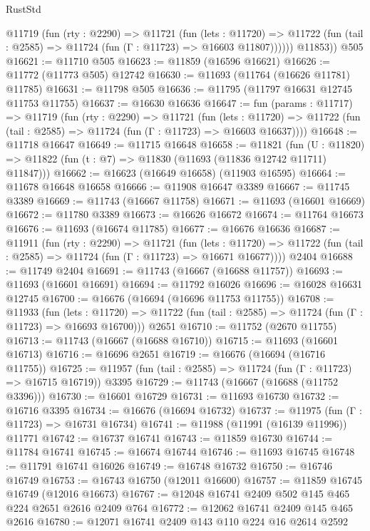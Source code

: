 \begin{lexlean}{RustStd}
\begin{coremodule}
          @11719
            (fun (rty : @2290) =>
            @11721
              (fun (lets : @11720) =>
              @11722 (fun (tail : @2585) => @11724 (fun (Γ : @11723) => @16603 @11807))))))
        @11853))
    @505
@16621 := @11710 @505
@16623 := @11859 (@16596 @16621)
@16626 := @11772 (@11773 @505) @12742
@16630 := @11693 (@11764 (@16626 @11781) @11785)
@16631 := @11798 @505
@16636 := @11795 (@11797 @16631 @12745 @11753 @11755)
@16637 := @16630 @16636
@16647 := fun (params : @11717) =>
  @11719
    (fun (rty : @2290) =>
    @11721
      (fun (lets : @11720) =>
      @11722 (fun (tail : @2585) => @11724 (fun (Γ : @11723) => @16603 @16637))))
@16648 := @11718 @16647
@16649 := @11715 @16648
@16658 := @11821
    (fun (U : @11820) => @11822 (fun (t : @7) => @11830 (@11693 (@11836 @12742 @11711) @11847)))
@16662 := @16623 (@16649 @16658) (@11903 @16595)
@16664 := @11678 @16648 @16658
@16666 := @11908 @16647 @3389
@16667 := @11745 @3389
@16669 := @11743 (@16667 @11758)
@16671 := @11693 (@16601 @16669)
@16672 := @11780 @3389
@16673 := @16626 @16672
@16674 := @11764 @16673
@16676 := @11693 (@16674 @11785)
@16677 := @16676 @16636
@16687 := @11911
    (fun (rty : @2290) =>
    @11721
      (fun (lets : @11720) =>
      @11722 (fun (tail : @2585) => @11724 (fun (Γ : @11723) => @16671 @16677))))
    @2404
@16688 := @11749 @2404
@16691 := @11743 (@16667 (@16688 @11757))
@16693 := @11693 (@16601 @16691)
@16694 := @11792 @16026
@16696 := @16028 @16631 @12745
@16700 := @16676 (@16694 (@16696 @11753 @11755))
@16708 := @11933
    (fun (lets : @11720) =>
    @11722 (fun (tail : @2585) => @11724 (fun (Γ : @11723) => @16693 @16700)))
    @2651
@16710 := @11752 (@2670 @11755)
@16713 := @11743 (@16667 (@16688 @16710))
@16715 := @11693 (@16601 @16713)
@16716 := @16696 @2651
@16719 := @16676 (@16694 (@16716 @11755))
@16725 := @11957 (fun (tail : @2585) => @11724 (fun (Γ : @11723) => @16715 @16719)) @3395
@16729 := @11743 (@16667 (@16688 (@11752 @3396)))
@16730 := @16601 @16729
@16731 := @11693 @16730
@16732 := @16716 @3395
@16734 := @16676 (@16694 @16732)
@16737 := @11975 (fun (Γ : @11723) => @16731 @16734)
@16741 := @11988 (@11991 (@16139 @11996)) @11771
@16742 := @16737 @16741
@16743 := @11859 @16730
@16744 := @11784 @16741
@16745 := @16674 @16744
@16746 := @11693 @16745
@16748 := @11791 @16741 @16026
@16749 := @16748 @16732
@16750 := @16746 @16749
@16753 := @16743 @16750 (@12011 @16600)
@16757 := @11859 @16745 @16749 (@12016 @16673)
@16767 := @12048 @16741 @2409 @502 @145 @465 @224 @2651 @2616 @2409 @764
@16772 := @12062 @16741 @2409 @145 @465 @2616
@16780 := @12071 @16741 @2409 @143 @110 @224 @16 @2614 @2592

\end{coremodule}
\end{lexlean}
